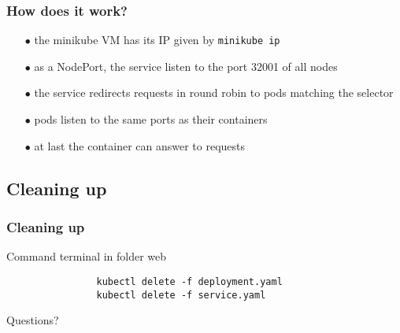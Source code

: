 	\begin{frame}[fragile]
		\frametitle{How does it work?}
		
		\begin{itemize}
			\item[$\bullet$] the minikube VM has its IP given by \verb!minikube ip!
			\item[$\bullet$] as a NodePort, the service listen to the port 32001 of all nodes
			\item[$\bullet$] the service redirects requests in round robin to pods matching the selector
			\item[$\bullet$] pods listen to the same ports as their containers
			\item[$\bullet$] at last the container can answer to requests
		\end{itemize}
	\end{frame}
	
\subsection{Cleaning up}

	\begin{frame}[fragile]
		\frametitle{Cleaning up}
		
		\begin{block}{Command terminal in folder web}
			\begin{verbatim}
				kubectl delete -f deployment.yaml
				kubectl delete -f service.yaml
			\end{verbatim}
		\end{block}
	\end{frame}
	
	\begin{frame}
		\begin{center}
			Questions?
		\end{center}
	\end{frame}
